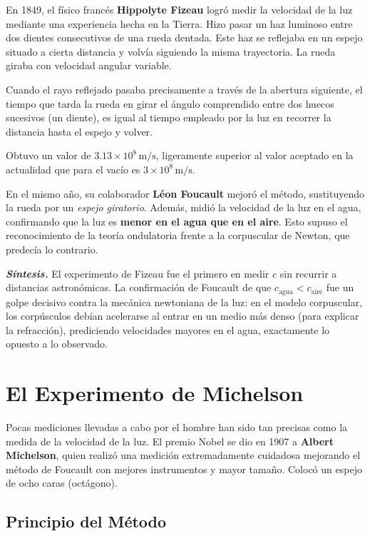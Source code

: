 \documentclass[12pt, a4paper]{article}
\theoremstyle{definition}
\begin{document}
En 1849, el físico francés \textbf{Hippolyte Fizeau} logró medir la velocidad de la luz
mediante una experiencia hecha en la Tierra. Hizo pasar un haz luminoso entre dos dientes
consecutivos de una rueda dentada. Este haz se reflejaba en un espejo situado a cierta
distancia y volvía siguiendo la misma trayectoria. La rueda giraba con velocidad angular
variable.

Cuando el rayo reflejado pasaba precisamente a través de la abertura siguiente, el tiempo que
tarda la rueda en girar el ángulo comprendido entre dos huecos sucesivos (un diente), es igual
al tiempo empleado por la luz en recorrer la distancia hasta el espejo y volver.

Obtuvo un valor de \(3.13 \times 10^8\,\text{m/s}\), ligeramente superior al valor aceptado en
la actualidad que para el vacío es \(3 \times 10^8\,\text{m/s}\).

En el mismo año, su colaborador \textbf{Léon Foucault} mejoró el método, sustituyendo la rueda
por un \textit{espejo giratorio}. Además, midió la velocidad de la luz en el agua, confirmando
que la luz es \textbf{menor en el agua que en el aire}. Esto supuso el reconocimiento de la
teoría ondulatoria frente a la corpuscular de Newton, que predecía lo contrario.

\textit{\textbf{Síntesis.}} El experimento de Fizeau fue el primero en medir \(c\) sin recurrir
a distancias astronómicas. La confirmación de Foucault de que \(c_{\text{agua}} < c_{\text{aire}}\)
fue un golpe decisivo contra la mecánica newtoniana de la luz: en el modelo corpuscular,
los corpúsculos debían acelerarse al entrar en un medio más denso (para explicar la refracción),
prediciendo velocidades mayores en el agua, exactamente lo opuesto a lo observado.

\section{El Experimento de Michelson}
\label{sec:michelson}

Pocas mediciones llevadas a cabo por el hombre han sido tan precisas como la medida de la
velocidad de la luz. El premio Nobel se dio en 1907 a \textbf{Albert Michelson}, quien realizó
una medición extremadamente cuidadosa mejorando el método de Foucault con mejores instrumentos
y mayor tamaño. Colocó un espejo de ocho caras (octágono).

\subsection{Principio del Método}
\end{document}
